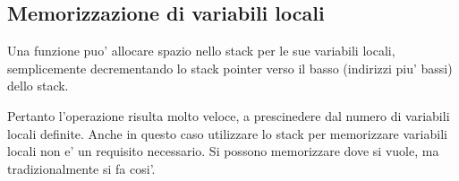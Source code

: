 \subsection{Memorizzazione di variabili locali}

Una funzione puo' allocare spazio nello stack per le sue variabili locali, semplicemente decrementando
lo \gls{stack pointer} verso il basso (indirizzi piu' bassi) dello stack.


Pertanto l'operazione risulta molto veloce, a prescinedere dal numero di variabili locali definite.
Anche in questo caso utilizzare lo stack per memorizzare variabili locali non e' un requisito necessario.
Si possono memorizzare dove si vuole, ma tradizionalmente si fa cosi'.
